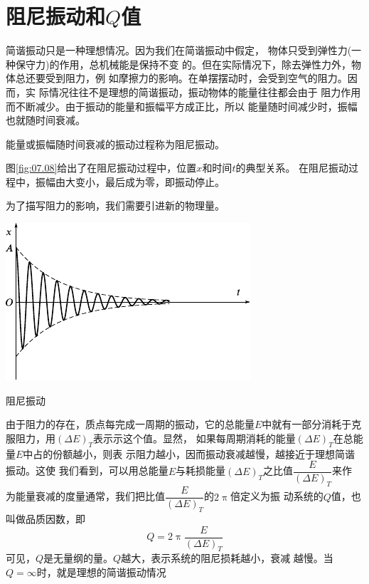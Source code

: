 \section{阻尼振动和$ Q $值}\label{sec:07.04}

简谐振动只是一种理想情况。因为我们在简谐振动中假定，
物体只受到弹性力(一种保守力)的作用，总机械能是保持不变
的。但在实际情况下，除去弹性力外，物体总还要受到阻力，例
如摩擦力的影响。在单摆摆动时，会受到空气的阻力。因而，实
际情况往往不是理想的简谐振动，振动物体的能量往往都会由于
阻力作用而不断减少。由于振动的能量和振幅平方成正比，所以
能量随时间减少时，振幅也就随时间衰减。

能量或振幅随时间衰减的振动过程称为阻尼振动。

图\ref{fig:07.08}\;给出了在阻尼振动过程中，位置$ x $和时间$ t $的典型关系。
在阻尼振动过程中，振幅由大变小，最后成为零，即振动停止。

为了描写阻力的影响，我们需要引进新的物理量。



\begin{figurex}[t]
  \centering
  \includegraphics{figure/fig07.08}

  \caption{阻尼振动}
  \label{fig:07.08}
\end{figurex}


由于阻力的存在，质点每完成一周期的振动，它的总能量$ E $中就有一部分消耗于克服阻力，用$ \left( \Delta E \right) _ { T } $表示示这个值。显然，
如果每周期消耗的能量$ \left( \Delta E \right) _ { T } $在总能量$ E $中占的份额越小，则表
示阻力越小，因而振动衰减越慢，越接近于理想简谐振动。这使
我们看到，可以用总能量$ E $与耗损能量$ \left( \Delta E \right) _ { T } $之比值$ \dfrac { E } { \left( \Delta E \right) _ { T } } $来作
为能量衰减的度量通常，我们把比值$ \dfrac { E } { \left( \Delta E \right) _ { T } } $的$ 2 \uppi $倍定义为振
动系统的$ Q $值，也叫做品质因数，即
\begin{equation}\label{eqn:07.04.01}
  Q = 2 \uppi \frac { E } { \left( \Delta E \right) _ { T } }
\end{equation}
可见，$ Q $是无量纲的量。$ Q $越大，表示系统的阻尼损耗越小，衰减
越慢。当$ Q = \infty $时，就是理想的简谐振动情况

